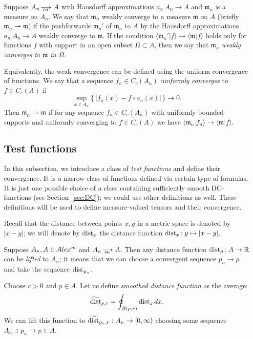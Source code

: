 Suppose $A_n\GHto A$ with Hausdorff approximations $a_n\:A_n\to A$ and
$\mathfrak m_n$ is a measure on $A_n$.
We say that $\mathfrak m_n$ weakly converge to a measure $\mathfrak m$ on $A$ (briefly $\mathfrak m_n\rightharpoonup \mathfrak m$) if the pushforwards $\mathfrak m_n'$ of $\mathfrak m_n$ to $A$  by the Hausdorff approximations $a_n\:A_n\to A$ weakly converge to 
$\mathfrak m$.
If the condition $\langle \mathfrak m_n'|f\rangle \to \langle \mathfrak m|f\rangle $ holds only for functions $f$ with support in an open subset $\Omega\subset A$, then we say that $\mathfrak m_n$ \emph{weakly converges to $\mathfrak m$ in $\Omega$}.

Equivalently, the weak convergence can be defined using the uniform convergence of functions.
We say that  a sequence $f_n\in C_c(A_n)$
\emph{uniformly converges} to $f\in C_c(A)$
if 
\[\sup_{x\in A_n}\{\,|f_n(x)-f\circ a_n(x)|\,\}\to 0.\]
Then  $\mathfrak m_n\rightharpoonup \mathfrak m$
if for any sequence $f_n\in C_c(A_n)$
with uniformly bounded supports and
uniformly converging to $f\in C_c(A)$
we have $\langle \mathfrak m_n|f_n\rangle \to \langle \mathfrak m|f\rangle $.


\subsection{Test functions}

In this subsection, we introduce a class of \emph{test functions} and define their convergence.
It is a narrow class of functions defined via certain type of formulas.
It is just one possible choice of a class containing sufficiently  smooth DC-functions (see Section~\ref{sec:DC}); we could use other definitions as well.
These definitions will be used to define measure-valued tensors and their convergence.

Recall that the distance between points $x,y$ in a metric space is denoted by $|x-y|$;
we will denote by $\operatorname{\rm dist}_x$ the distance function $\operatorname{\rm dist}_x\colon y\mapsto |x-y|$.

Suppose $A_n, A\in \mathcal{A}lex^m$ and  $A_n\GHto A$.
Then any distance function $\dist_p\:A\zz\to\RR$ can be \emph{lifted} to $A_n$;
it means that we can choose a convergent sequence $p_n\to p$ and take the
sequence $\operatorname{\rm dist}_{p_n}$.

Choose $r>0$ and $p\in A$.
Let us define \emph{smoothed distance function} as the average:
$$\widetilde{\operatorname{\rm dist}}_{p,r} =\oint_{B(p,r)} \operatorname{\rm dist}_{x}dx.$$ 
We can lift this function to
$\widetilde{\operatorname{\rm dist}}_{p_n,r}:A_n\to [0,\infty)$
choosing some  sequence $A_n\ni p_n\to p\in A$.


